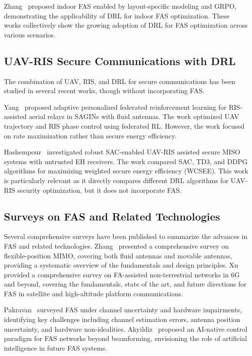 Zhang~\cite{zhang2026indoor} proposed indoor FAS enabled by layout-specific modeling and GRPO, demonstrating the applicability of DRL for indoor FAS optimization. These works collectively show the growing adoption of DRL for FAS optimization across various scenarios.

\subsection{UAV-RIS Secure Communications with DRL}

The combination of UAV, RIS, and DRL for secure communications has been studied in several recent works, though without incorporating FAS.

Yang~\cite{yang2026federated} proposed adaptive personalized federated reinforcement learning for RIS-assisted aerial relays in SAGINs with fluid antennas. The work optimized UAV trajectory and RIS phase control using federated RL. However, the work focused on rate maximization rather than secure energy efficiency.

Hashempour~\cite{hashempour2026robust} investigated robust SAC-enabled UAV-RIS assisted secure MISO systems with untrusted EH receivers. The work compared SAC, TD3, and DDPG algorithms for maximizing weighted secure energy efficiency (WCSEE). This work is particularly relevant as it directly compares different DRL algorithms for UAV-RIS security optimization, but it does not incorporate FAS.

\subsection{Surveys on FAS and Related Technologies}

Several comprehensive surveys have been published to summarize the advances in FAS and related technologies. Zhang~\cite{zhang2023flexible} presented a comprehensive survey on flexible-position MIMO, covering both fluid antennas and movable antennas, providing a systematic overview of the fundamentals and design principles. Xu~\cite{xu2025survey} provided a comprehensive survey on FA-assisted non-terrestrial networks in 6G and beyond, covering the fundamentals, state of the art, and future directions for FAS in satellite and high-altitude platform communications.

Pakravan~\cite{pakravan2026survey} surveyed FAS under channel uncertainty and hardware impairments, identifying key challenges including channel estimation errors, antenna position uncertainty, and hardware non-idealities. Akyildiz~\cite{akyildiz2026fas} proposed an AI-native control paradigm for FAS networks beyond beamforming, envisioning the role of artificial intelligence in future FAS systems.

